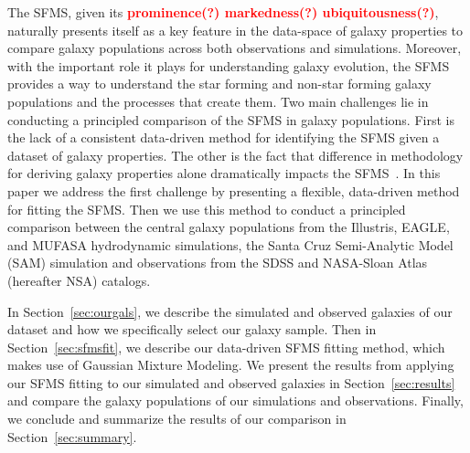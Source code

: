 \documentclass[preprint2,tighten]{aastex62}
\newcommand{\todo}[1]{{\bf \textcolor{red}{ #1}}}
\begin{document}
The SFMS, given its \todo{prominence(?) markedness(?) ubiquitousness(?)}, naturally presents itself as a key feature in the data-space of
galaxy properties to compare galaxy populations across both observations 
and simulations. Moreover, with the important role it plays for 
understanding galaxy evolution, the SFMS provides a way to understand the 
star forming and non-star forming galaxy populations and the processes 
that create them. Two main challenges lie in conducting a principled 
comparison of the SFMS in galaxy populations. First is the lack of a 
consistent data-driven method for identifying the SFMS given a dataset 
of galaxy properties. The other is the fact that difference in methodology 
for deriving galaxy properties alone dramatically impacts the 
SFMS~\citep[\emph{e.g.}][]{speagle2014}. 
In this paper we address the first challenge by presenting a flexible, 
data-driven method for fitting the SFMS. Then we use this method to conduct
a principled comparison between the central galaxy populations from the Illustris,
EAGLE, and MUFASA hydrodynamic simulations, the Santa Cruz Semi-Analytic 
Model (SAM) simulation and observations from the SDSS and NASA-Sloan Atlas
(hereafter NSA) catalogs. 

In Section~\ref{sec:ourgals}, we describe the simulated and observed 
galaxies of our dataset and how we specifically select our galaxy sample. 
Then in Section~\ref{sec:sfmsfit}, we describe our data-driven SFMS 
fitting method, which makes use of Gaussian Mixture Modeling. We present 
the results from applying our SFMS fitting to our simulated and observed
galaxies in Section~\ref{sec:results} and compare the galaxy populations
of our simulations and observations. Finally, we conclude and summarize
the results of our comparison in Section~\ref{sec:summary}.
\end{document}
